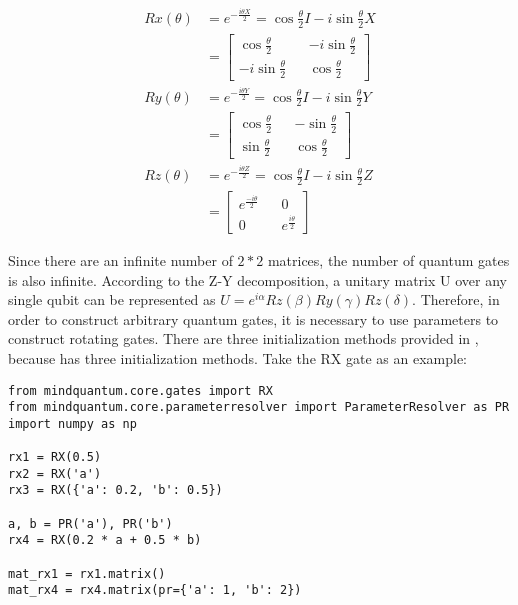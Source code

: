 \begin{align*}
    Rx(\theta) & =
    e^{-\frac{i\theta X}{2}}=
    \cos{\frac{\theta}{2}}I-i\sin{\frac{\theta}{2}}X                                  \\
               & =\begin{bmatrix}
                      \cos{\frac{\theta}{2}}   &  & -i\sin{\frac{\theta}{2}} \\
                      -i\sin{\frac{\theta}{2}} &  & \cos{\frac{\theta}{2}}
                  \end{bmatrix}    \\
    Ry(\theta) & =
    e^{-\frac{i\theta Y}{2}}=
    \cos{\frac{\theta}{2}}I-i\sin{\frac{\theta}{2}}Y                                  \\
               & =    \begin{bmatrix}
                          \cos{\frac{\theta}{2}} &  & -\sin{\frac{\theta}{2}} \\
                          \sin{\frac{\theta}{2}} &  & \cos{\frac{\theta}{2}}
                      \end{bmatrix} \\
    Rz(\theta) & =
    e^{-\frac{i\theta Z}{2}}=
    \cos{\frac{\theta}{2}}I-i\sin{\frac{\theta}{2}}Z                                  \\
               & =    \begin{bmatrix}
                          e^{\frac{-i\theta}{2}} &  & 0                     \\
                          0                      &  & e^{\frac{i\theta}{2}}
                      \end{bmatrix}
\end{align*}


Since there are an infinite number of $2*2$ matrices, the number of quantum gates is also infinite. According to the Z-Y decomposition, a unitary matrix U over any single qubit can be represented as $U=e^{i\alpha}Rz(\beta)Ry(\gamma)Rz(\delta)$. Therefore, in order to construct arbitrary quantum gates, it is necessary to use parameters to construct rotating gates. There are three initialization methods provided in \MindQuantum, because \ParameterResolver has three initialization methods. Take the RX gate as an example:

\begin{lstlisting}
from mindquantum.core.gates import RX
from mindquantum.core.parameterresolver import ParameterResolver as PR
import numpy as np

rx1 = RX(0.5)
rx2 = RX('a')
rx3 = RX({'a': 0.2, 'b': 0.5})

a, b = PR('a'), PR('b')
rx4 = RX(0.2 * a + 0.5 * b)

mat_rx1 = rx1.matrix()
mat_rx4 = rx4.matrix(pr={'a': 1, 'b': 2})
\end{lstlisting}

